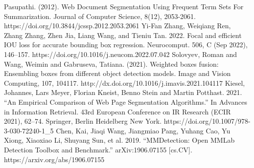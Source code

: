 \documentclass[conference]{IEEEtran}
\begin{document}
\begin{thebibliography}{00}
 Pasupathi. (2012). Web Document Segmentation Using Frequent Term Sets For Summarization. Journal of Computer Science, 8(12), 2053-2061. https://doi.org/10.3844/jcssp.2012.2053.2061
 Yi-Fan Zhang, Weiqiang Ren, Zhang Zhang, Zhen Jia, Liang Wang, and Tieniu Tan. 2022. Focal and efficient IOU loss for accurate bounding box regression. Neurocomput. 506, C (Sep 2022), 146–157. https://doi.org/10.1016/j.neucom.2022.07.042
 Solovyev, Roman and Wang, Weimin and Gabruseva, Tatiana. (2021). Weighted boxes fusion: Ensembling boxes from different object detection models. Image and Vision Computing, 107, 104117. http://dx.doi.org/10.1016/j.imavis.2021.104117
 Kiesel, Johannes, Lars Meyer, Florian Kneist, Benno Stein and Martin Potthast. 2021. “An Empirical Comparison of Web Page Segmentation Algorithms.” In Advances in Information Retrieval. 43rd European Conference on IR Research (ECIR 2021), 62–74. Springer, Berlin Heidelberg New York. https://doi.org/10.1007/978-3-030-72240-1\_5
 Chen, Kai, Jiaqi Wang, Jiangmiao Pang, Yuhang Cao, Yu Xiong, Xiaoxiao Li, Shuyang Sun, et al. 2019. “MMDetection: Open MMLab Detection Toolbox and Benchmark.” arXiv:1906.07155 [cs.CV]. https://arxiv.org/abs/1906.07155
\end{thebibliography}



\end{document}
